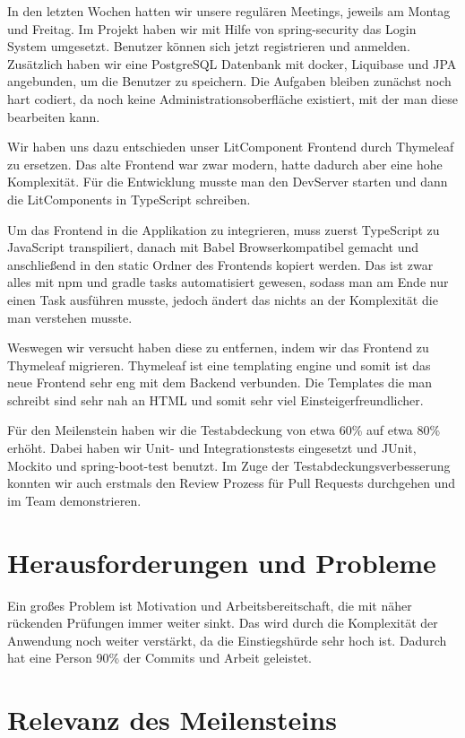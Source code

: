 \documentclass[a4paper, 12pt, oneside, BCOR1cm,toc=chapterentrywithdots]{scrbook}
\begin{document}
In den letzten Wochen hatten wir unsere regulären Meetings, jeweils am Montag und Freitag. Im Projekt haben wir mit Hilfe von spring-security das Login System umgesetzt. Benutzer können sich jetzt registrieren und anmelden. Zusätzlich haben wir eine PostgreSQL Datenbank mit docker, Liquibase und JPA angebunden, um die Benutzer zu speichern. Die Aufgaben bleiben zunächst noch hart codiert, da noch keine Administrationsoberfläche existiert, mit der man diese bearbeiten kann.

Wir haben uns dazu entschieden unser LitComponent Frontend durch Thymeleaf zu ersetzen. Das alte Frontend war zwar modern, hatte dadurch aber eine hohe Komplexität. Für die Entwicklung musste man den DevServer starten und dann die LitComponents in TypeScript schreiben.

Um das Frontend in die Applikation zu integrieren, muss zuerst TypeScript zu JavaScript transpiliert, danach mit Babel Browserkompatibel gemacht und anschließend in den static Ordner des Frontends kopiert werden. Das ist zwar alles mit npm und gradle tasks automatisiert gewesen, sodass man am Ende nur einen Task ausführen musste, jedoch ändert das nichts an der Komplexität die man verstehen musste.

Weswegen wir versucht haben diese zu entfernen, indem wir das Frontend zu Thymeleaf migrieren. Thymeleaf ist eine templating engine und somit ist das neue Frontend sehr eng mit dem Backend verbunden. Die Templates die man schreibt sind sehr nah an HTML und somit sehr viel Einsteigerfreundlicher.

Für den Meilenstein haben wir die Testabdeckung von etwa 60\% auf etwa 80\% erhöht. Dabei haben wir Unit- und Integrationstests eingesetzt und JUnit, Mockito und spring-boot-test benutzt. Im Zuge der Testabdeckungsverbesserung konnten wir auch erstmals den Review Prozess für Pull Requests durchgehen und im Team demonstrieren.

\section*{Herausforderungen und Probleme}

Ein großes Problem ist Motivation und Arbeitsbereitschaft, die mit näher rückenden Prüfungen immer weiter sinkt. Das wird durch die Komplexität der Anwendung noch weiter verstärkt, da die Einstiegshürde sehr hoch ist. Dadurch hat eine Person 90\% der Commits und Arbeit geleistet. 

\section*{Relevanz des Meilensteins}
\end{document}
